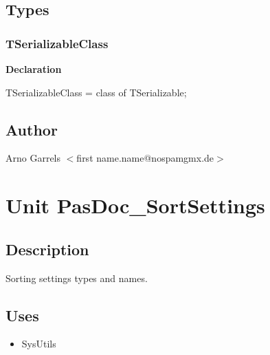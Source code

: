 \documentclass{report}
\newif\ifpdf
\begin{document}
\section{Types}
\ifpdf
\subsection*{\large{\textbf{TSerializableClass}}\normalsize\hspace{1ex}\hrulefill}
\else
\subsection*{TSerializableClass}
\fi
\label{PasDoc_Serialize-TSerializableClass}
\begin{list}{}{
\setlength{\itemindent}{0cm}
\setlength{\listparindent}{0cm}
\setlength{\leftmargin}{\evensidemargin}
\addtolength{\leftmargin}{\tmplength}
\settowidth{\labelsep}{X}
\addtolength{\leftmargin}{\labelsep}
\setlength{\labelwidth}{\tmplength}
}
\item[\textbf{Declaration}\hfill]
\ifpdf
\begin{flushleft}
\fi
\begin{ttfamily}
TSerializableClass = class of TSerializable;\end{ttfamily}

\ifpdf
\end{flushleft}
\fi

\end{list}
\section{Author}
\par
Arno Garrels {$<$}first name.name@nospamgmx.de{$>$}

\chapter{Unit PasDoc{\_}SortSettings}
\label{PasDoc_SortSettings}
\section{Description}
Sorting settings types and names.
\section{Uses}
\begin{itemize}
\item \begin{ttfamily}SysUtils\end{ttfamily}\end{itemize}
\end{document}
